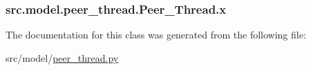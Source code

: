 \subsubsection[{x}]{\setlength{\rightskip}{0pt plus 5cm}src.\+model.\+peer\+\_\+thread.\+Peer\+\_\+\+Thread.\+x}\label{classsrc_1_1model_1_1peer__thread_1_1Peer__Thread_a6f4887d821a57e79c96063f215b096ea}


The documentation for this class was generated from the following file\+:\begin{DoxyCompactItemize}
\item 
src/model/\hyperlink{peer__thread_8py}{peer\+\_\+thread.\+py}\end{DoxyCompactItemize}
